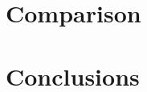 \documentclass[target=bach,aauheader=]{thud}
\begin{document}
\chapter{Comparison}


\chapter{Conclusions}



\backmatter




\end{document}
